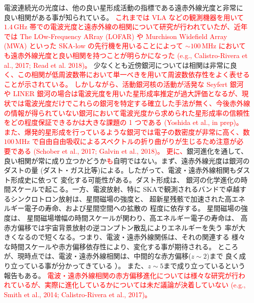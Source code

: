 電波連続光の光度は、他の良い星形成活動の指標である遠赤外線光度と非常に
良い相関がある事が知られている\citep{1992ARA&A..30..575C,2001ApJ...554..803Y}。
\textcolor{red}{これまでは VLA などの観測機器を用いて $1.4\,\mathrm{GHz}$ 帯での電波光度と遠赤外線の相関について研究が行われていたが、近年では The LOw-Frequency ARray (LOFAR) や Murchison Widefield Array (MWA) といった SKA-low の先行機を用いることによって $\sim 100\,\mathrm{MHz}$ においても遠赤外線光度と良い相関を持つことが明らかになった (e.g., Calistro-Rivera et al., 2017; Read et al. 2018)。}
少なくとも近傍銀河については相関は非常に良\textcolor{red}{く、この相関が低周波数帯において単一べきを用いて周波数依存性をよく表せることが示されている。
しかしながら、活動銀河核の活動が活発な Seyfert 銀河や LINER 銀河の場合は電波光度を用いた星形成率推定が過大評価となるが、現状では電波光度だけでこれらの銀河を特定する確立した手法が無く、今後赤外線の情報が得られていない銀河において電波光度から求められた星形成率の信頼性をどの程度保証できるかは大きな課題の 1 つである (Yoshida et al., in prep)。
また、爆発的星形成を行っているような銀河では電子の数密度が非常に高く、数 $100\,\mathrm{MHz}$ で自由自由吸収によるスペクトルの折り曲がりが生じるため注意が必要である (Schober et al., 2017; Galvin et al., 2018)。}
\textcolor{red}{更に、}銀河進化を通して、良い相関が常に成り立つかどうか\textcolor{red}{も}自明ではない。まず、遠赤外線光度は銀河のダストの量
(ダスト・ガス比等)による。したがって、電波・遠赤外線相関もダスト形成史に依って
変化する可能性がある\citep{2013MNRAS.429.3390H}。ダスト形成は、
銀河の化学進化の時間スケールで起こる。一方、電波放射、特に
SKAで観測されるバンドで卓越するシンクロトロン放射は、星間磁場の強度と、
超新星残骸で加速された高エネルギー電子の寿命、および星間空間への拡散の
程度に依存する\citep{2006ApJ...651L.111M}。
星間磁場の強度は、
星間磁場増幅の時間スケールが関わり、高エネルギー電子の寿命は、
高赤方偏移では宇宙背景放射の逆コンプトン散乱によりエネルギーを失う
率が大きくなるので短くなる。つまり、電波・遠赤外線関係は、それの関連する
様々な時間スケールや赤方偏移依存性により、変化する事が期待される。
ところが、現時点では、電波・遠赤外線相関は、中間的な赤方偏移($z\sim 2$)まで
良く成り立っている事が分かってきている
\citep[e.g.,][]{2002A&A...384L..19G,2003MNRAS.341L...1G,2008MNRAS.386..953I,2009ApJ...706..482M}）。
また、$z\sim5$まで成り立っているという報告もある\citep{2010ApJ...712..942M}。
\textcolor{red}{電波・遠赤外線相関の赤方偏移進化については様々な研究が行われているが、実際に進化しているかについては未だ議論が決着していない (e.g., Smith et al., 2014; Calistro-Rivera et al., 2017)。}

